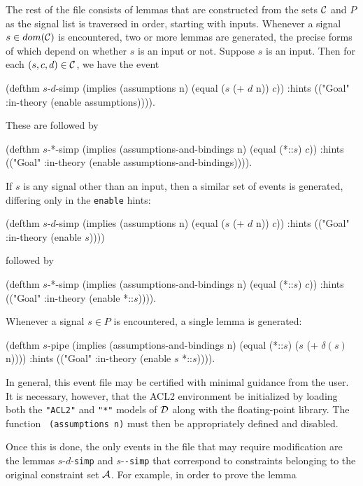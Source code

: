 \documentclass{article}
\begin{document}
The rest of the file consists of lemmas that are constructed from the
sets ${\cal C}$ and $P$ as the signal list is traversed in order,
starting with inputs.  Whenever a signal $s \in dom({\cal C})$ is encountered,
two or more lemmas are generated, the precise forms of which depend on
whether $s$ is an input or not.  Suppose $s$ is an input.  Then for each
$(s,c,d) \in {\cal C}$, we have the event\medskip

\begin{acl2}
(defthm $s$-$d$-simp
  (implies (assumptions n)
           (equal ($s$ (+ $d$ n)) $c$))
  :hints (("Goal" :in-theory (enable assumptions)))).
\end{acl2}\noindent
These are followed by\medskip

\begin{acl2}
(defthm $s$-*-simp
  (implies (assumptions-and-bindings n)
           (equal (*::$s$) $c$))
  :hints 
  (("Goal" :in-theory (enable assumptions-and-bindings)))).
\end{acl2}\noindent
If $s$ is any signal other than an input, then a similar set of events
is generated, differing only in the {\tt enable} hints:\medskip

\begin{acl2}
(defthm $s$-$d$-simp
  (implies (assumptions n)
           (equal ($s$ (+ $d$ n)) $c$))
  :hints (("Goal" :in-theory (enable $s$))))
\end{acl2}\noindent
followed by\medskip

\begin{acl2}
(defthm $s$-*-simp
  (implies (assumptions-and-bindings n)
           (equal (*::$s$) $c$))
  :hints (("Goal" :in-theory (enable *::$s$)))).
\end{acl2}
\indent Whenever a signal $s \in P$ is encountered, a single lemma is
generated:\medskip

\begin{acl2}
(defthm $s$-pipe
  (implies (assumptions-and-bindings n)
           (equal (*::$s$) ($s$ (+ $\delta(s)$ n))))
  :hints (("Goal" :in-theory (enable $s$ *::$s$)))).
\end{acl2}
\indent In general, this event file may be certified with minimal guidance
from the user.  It is necessary, however, that the ACL2 environment be
initialized by loading both the \verb!"ACL2"! and \verb!"*"! models of
${\cal D}$ along with the floating-point library.  The function {\tt
(assumptions n)} must then be appropriately defined and disabled.

Once this is done, the only events in the file that may require
modification are the lemmas $s$-$d$-{\tt simp} and $s$-{\tt *-simp}
that correspond to constraints belonging to the original constraint
set ${\cal A}$.  For example, in order to prove the lemma
\end{document}
